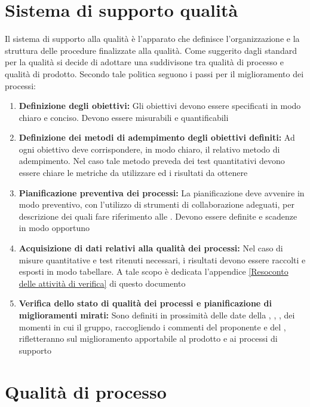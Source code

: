 \documentclass[12pt,a4paper]{article}
\begin{document}
\newpage
\section{Sistema di supporto qualità}
Il sistema di supporto alla qualità è l'apparato che definisce l'organizzazione e la struttura delle procedure finalizzate alla qualità. Come suggerito dagli standard per la qualità si decide di adottare una suddivisone tra qualità di processo e qualità di prodotto. Secondo tale politica seguono i passi per il miglioramento dei processi: 

\begin{enumerate}
	\item \textbf {Definizione degli obiettivi:} Gli obiettivi devono essere specificati in modo chiaro e conciso. Devono essere misurabili e quantificabili
	\item \textbf{Definizione dei metodi di adempimento degli obiettivi definiti:} Ad ogni obiettivo deve corrispondere, in modo chiaro, il relativo metodo di adempimento. Nel caso tale metodo preveda dei test quantitativi devono essere chiare le metriche da utilizzare ed i risultati da ottenere
	\item \textbf{Pianificazione preventiva dei processi:} La pianificazione deve avvenire in modo preventivo, con l'utilizzo di strumenti di collaborazione adeguati, per descrizione dei quali fare riferimento alle \NdP{}. Devono essere definite  e scadenze in modo opportuno
	\item \textbf{Acquisizione di dati relativi alla qualità dei processi:} Nel caso di misure quantitative e test ritenuti necessari, i risultati devono essere raccolti e esposti in modo tabellare. A tale scopo è dedicata l'appendice \ref{Resoconto delle attività di verifica} di questo documento
	\item \textbf{Verifica dello stato di qualità dei processi e pianificazione di miglioramenti mirati:}
	Sono definiti in prossimità delle date della \RR{}, \RA{}, \RP{}, \RQ{} dei momenti in cui il gruppo, raccogliendo i commenti del proponente \Zucchetti{} e del \Vardanega{}, rifletteranno sul miglioramento apportabile al prodotto e ai processi di supporto
\end{enumerate}

\newpage

\section{Qualità di processo}
\end{document}
